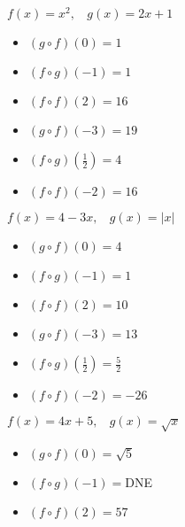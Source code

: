 \documentclass[12pt]{book}
\theoremstyle{definition}
\begin{document}
\begin{oddenumerate}
\item $f(x)=x^2,~~~~g(x)=2x+1$
\begin{multicols}{3}
\begin{itemize}
\item  $(g\circ f)(0)=1$
\item  $(f\circ g)(-1)=1$
\item  $(f\circ f)(2)=16$
\end{itemize}
\end{multicols}

\begin{multicols}{3}
\begin{itemize}
\item  $(g\circ f)(-3)=19$
\item  $(f\circ g)(\frac{1}{2})=4$
\item  $(f\circ f)(-2)=16$
\end{itemize}
\end{multicols}

\item $f(x)=4-3x,~~~~g(x)=|x|$
\begin{multicols}{3}
\begin{itemize}
\item  $(g\circ f)(0)=4$
\item  $(f\circ g)(-1)=1$
\item  $(f\circ f)(2)=10$
\end{itemize}
\end{multicols}

\begin{multicols}{3}
\begin{itemize}
\item  $(g\circ f)(-3)=13$
\item  $(f\circ g)(\frac{1}{2})=\frac{5}{2}$
\item  $(f\circ f)(-2)=-26$
\end{itemize}
\end{multicols}

\item $f(x)=4x+5,~~~~g(x)=\sqrt{x}$
\begin{multicols}{3}
\begin{itemize}
\item  $(g\circ f)(0)=\sqrt{5}$
\item  $(f\circ g)(-1)=$DNE
\item  $(f\circ f)(2)=57$
\end{itemize}
\end{multicols}


\end{oddenumerate}
\end{document}
